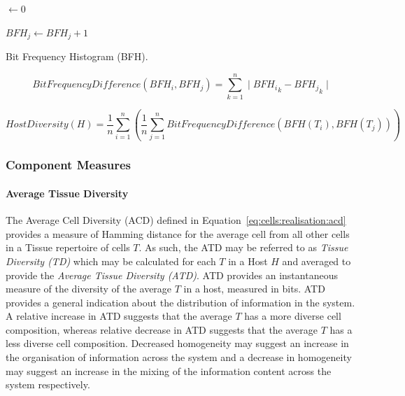 
\begin{algorithm}[ht]	
	\SetLine		
	
	\KwIn{\Tissue}
	\KwOut{\BFH}
	
	\BFH $\leftarrow$0\;
	
	{
		{
			{
				$BFH_j \leftarrow BFH_j + 1$\;
			}
		}
	}	
	\Return{\BFH}\;
	\caption{Bit Frequency Histogram (BFH).}
	\label{alg:tissues:measures:bfh}
\end{algorithm}

\begin{equation}
	BitFrequencyDifference(BFH_{i}, BFH_{j}) = \sum_{k=1}^n \mid {BFH_{i}}_{k} - {BFH_{j}}_{k} \mid
	\label{eq:tissues:measure:bdf}
\end{equation}

\begin{equation}
	HostDiversity(H) = \frac{1}{n}\sum_{i=1}^n \left(\frac{1}{n}\sum_{j=1}^n BitFrequencyDifference(BFH(T_i), BFH(T_j))\right) 	
	\label{eq:tissues:measure:hd}
\end{equation}

%
%
\subsubsection{Component Measures}

%
%
\paragraph{Average Tissue Diversity}
The Average Cell Diversity (ACD) defined in Equation~\ref{eq:cells:realisation:acd} provides a measure of Hamming distance for the average cell from all other cells in a Tissue repertoire of cells $T$. As such, the ATD may be referred to as \emph{Tissue Diversity (TD)} which may be calculated for each $T$ in a Host $H$ and averaged to provide the \emph{Average Tissue Diversity (ATD)}. ATD provides an instantaneous measure of the diversity of the average $T$ in a host, measured in bits.
ATD provides a general indication about the distribution of information in the system. A relative increase in ATD suggests that the average $T$ has a more diverse cell composition, whereas relative decrease in ATD suggests that the average $T$ has a less diverse cell composition. Decreased homogeneity may suggest an increase in the organisation of information across the system and a decrease in homogeneity may suggest an increase in the mixing of the information content across the system respectively.

